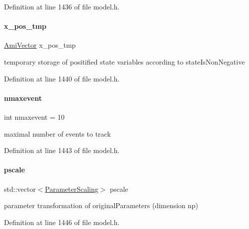 Definition at line 1436 of file model.\+h.

\mbox{\label{classamici_1_1_model_a2dc43104a5b25d9689d827fc51f04346}} 
\paragraph{\texorpdfstring{x\_pos\_tmp}{x\_pos\_tmp}}
{\footnotesize\ttfamily \mbox{\hyperlink{classamici_1_1_ami_vector}{Ami\+Vector}} x\+\_\+pos\+\_\+tmp\hspace{0.3cm}{\ttfamily [protected]}}

temporary storage of positified state variables according to state\+Is\+Non\+Negative 

Definition at line 1440 of file model.\+h.

\mbox{\label{classamici_1_1_model_aff0f3f25d886279a90dbf0571956885c}} 
\paragraph{\texorpdfstring{nmaxevent}{nmaxevent}}
{\footnotesize\ttfamily int nmaxevent = 10\hspace{0.3cm}{\ttfamily [protected]}}

maximal number of events to track 

Definition at line 1443 of file model.\+h.

\mbox{\label{classamici_1_1_model_a5d1c7237dc998202fe1b3393b50f77ce}} 
\paragraph{\texorpdfstring{pscale}{pscale}}
{\footnotesize\ttfamily std\+::vector$<$\mbox{\hyperlink{namespaceamici_a42f062082226e9284c201d9eab71a3a0}{Parameter\+Scaling}}$>$ pscale\hspace{0.3cm}{\ttfamily [protected]}}

parameter transformation of {\ttfamily original\+Parameters} (dimension np) 

Definition at line 1446 of file model.\+h.

